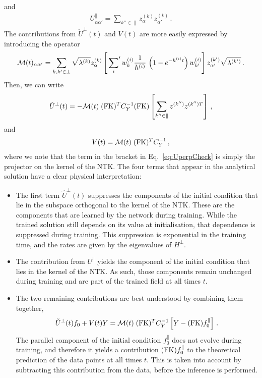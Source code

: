 and
\begin{align}
    U^\parallel_{\alpha\alpha'}
        = \sum_{k''\in\parallel} z^{(k)}_\alpha z^{(k)}_{\alpha'} \, .
\end{align}
The contributions from $\check{U}^\perp(t)$ and $V(t)$ are more easily expressed
by introducing the operator
\begin{align}
    \label{eq:MOperatorDef}
    \mathcal{M}(t)_{\alpha\alpha'} 
        = \sum_{k,k'\in\perp} \sqrt{\lambda^{(k)}} z^{(k)}_\alpha 
            \left[\sideset{}{'}\sum_{i} w^{(i)}_{k} \frac{1}{h^{(i)}}\, 
            \left( 1- e^{-h^{(i)}t}\right) w^{(i)}_{k'}\right]
            z^{(k')}_{\alpha'} \sqrt{\lambda^{(k')}}\,. 
\end{align}
Then, we can write
\begin{align}
    \label{eq:UperpCheck}
    \check{U}^\perp(t)
        = - \mathcal{M}(t)\; (\mathrm{FK})^T C_Y^{-1} (\mathrm{FK}) 
            \left[\sum_{k''\in\parallel} z^{(k'')} z^{(k'') T}\right]\, ,
\end{align}
and
\begin{align}
    V(t) = \mathcal{M}(t)\; (\mathrm{FK})^T C_Y^{-1}\, ,
\end{align}
where we note that the term in the bracket in Eq.~\eqref{eq:UperpCheck} is
simply the projector on the kernel of the NTK. The four terms that appear in the
analytical solution have a clear physical interpretation:
\begin{itemize}
    \item The first term $\hat{U}^\perp(t)$ suppresses the components of the
    initial condition that lie in the subspace orthogonal to the kernel of the
    NTK. These are the components that are learned by the network during
    training. While the trained solution still depends on its value at
    initialisation, that dependence is suppressed during training. This
    suppression is exponential in the training time, and the rates are given by
    the eigenvalues of $H^{\perp}$.
    \item The contribution from $U^\parallel$ yields the component of the
    initial condition that lies in the kernel of the NTK. As such, those
    components remain unchanged during training and are part of the trained
    field at all times $t$. 
    \item The two remaining contributions are best understood by combining them
    together,
    \begin{align}
        \label{eq:DataCorrectedInference}
        \check{U}^{\perp}(t) f_{0} + V(t) Y 
            = \mathcal{M}(t)\; (\mathrm{FK})^T C_Y^{-1} \left[Y - (\mathrm{FK}) f_{0}^{\parallel}\right]\, .
    \end{align}
    The parallel component of the initial condition $f_{0}^{\parallel}$ does not
    evolve during training, and therefore it yields a contribution $(\mathrm{FK})
    f_{0}^{\parallel}$ to the theoretical prediction of the data points at all
    times $t$. This is taken into account by subtracting this contribution from
    the data, before the inference is performed.
\end{itemize}

